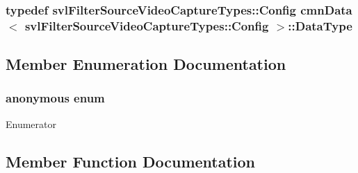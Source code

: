 \subsubsection[{Data\+Type}]{\setlength{\rightskip}{0pt plus 5cm}typedef {\bf svl\+Filter\+Source\+Video\+Capture\+Types\+::\+Config} {\bf cmn\+Data}$<$ {\bf svl\+Filter\+Source\+Video\+Capture\+Types\+::\+Config} $>$\+::{\bf Data\+Type}}\label{classcmn_data_3_01svl_filter_source_video_capture_types_1_1_config_01_4_aff938e4d56457fbe9133d8b6cbcd5490}


\subsection{Member Enumeration Documentation}
\hypertarget{classcmn_data_3_01svl_filter_source_video_capture_types_1_1_config_01_4_a2a9a92c1b483270a07fb4453ed08344f}{}\subsubsection[{anonymous enum}]{\setlength{\rightskip}{0pt plus 5cm}anonymous enum}\label{classcmn_data_3_01svl_filter_source_video_capture_types_1_1_config_01_4_a2a9a92c1b483270a07fb4453ed08344f}
\begin{Desc}
\item[Enumerator]\par
\begin{description}
\item[{\em 
\hypertarget{classcmn_data_3_01svl_filter_source_video_capture_types_1_1_config_01_4_a2a9a92c1b483270a07fb4453ed08344fabcffae4188f1c2ab2261eeaa659ca91f}{}I\+S\+\_\+\+S\+P\+E\+C\+I\+A\+L\+I\+Z\+E\+D\label{classcmn_data_3_01svl_filter_source_video_capture_types_1_1_config_01_4_a2a9a92c1b483270a07fb4453ed08344fabcffae4188f1c2ab2261eeaa659ca91f}
}]\end{description}
\end{Desc}


\subsection{Member Function Documentation}
\hypertarget{classcmn_data_3_01svl_filter_source_video_capture_types_1_1_config_01_4_ac0c22a9bd413153902c89d9f049c73cd}{}
